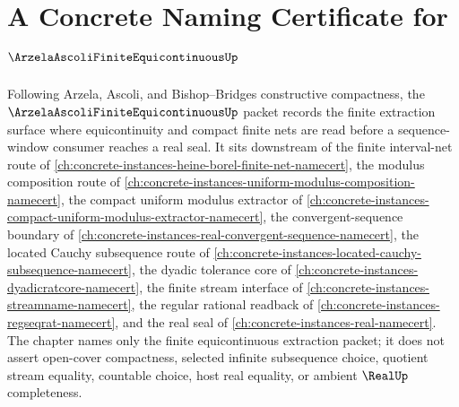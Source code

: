 \chapter{A Concrete Naming Certificate for $\ArzelaAscoliFiniteEquicontinuousUp$}
\label{ch:concrete-instances-arzela-ascoli-finite-equicontinuous-namecert}

Following Arzela, Ascoli, and Bishop--Bridges constructive compactness, the $\ArzelaAscoliFiniteEquicontinuousUp$ packet records the finite extraction surface where equicontinuity and compact finite nets are read before a sequence-window consumer reaches a real seal. It sits downstream of the finite interval-net route of \autoref{ch:concrete-instances-heine-borel-finite-net-namecert}, the modulus composition route of \autoref{ch:concrete-instances-uniform-modulus-composition-namecert}, the compact uniform modulus extractor of \autoref{ch:concrete-instances-compact-uniform-modulus-extractor-namecert}, the convergent-sequence boundary of \autoref{ch:concrete-instances-real-convergent-sequence-namecert}, the located Cauchy subsequence route of \autoref{ch:concrete-instances-located-cauchy-subsequence-namecert}, the dyadic tolerance core of \autoref{ch:concrete-instances-dyadicratcore-namecert}, the finite stream interface of \autoref{ch:concrete-instances-streamname-namecert}, the regular rational readback of \autoref{ch:concrete-instances-regseqrat-namecert}, and the real seal of \autoref{ch:concrete-instances-real-namecert}. The chapter names only the finite equicontinuous extraction packet; it does not assert open-cover compactness, selected infinite subsequence choice, quotient stream equality, countable choice, host real equality, or ambient $\RealUp$ completeness.

